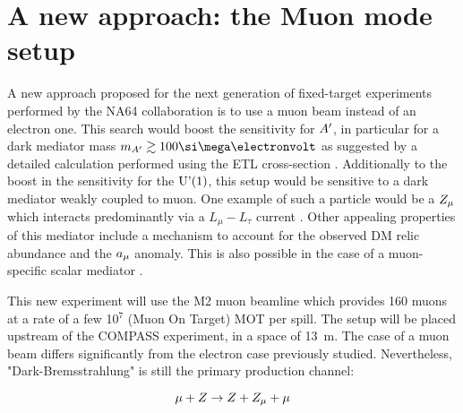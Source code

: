 \FloatBarrier\noindent
\section{A new approach: the Muon mode setup}
\label{ch5:sec:muon-mode-setup}

A new approach proposed for the next generation of fixed-target experiments performed by the NA64 collaboration is to use a muon beam instead of an electron one. This search would boost the sensitivity for $A'$, in particular for a dark mediator mass $m_{\DM} \gtrsim 100 \mev$ as suggested by a detailed calculation performed using the ETL cross-section \cite{Gninenko:2019qiv}. Additionally to the boost in the sensitivity for the $\textrm{U'(1)}$, this setup would be sensitive to a dark mediator weakly coupled to muon. One example of such a particle would be a $Z_{\mu}$ which interacts predominantly via a $L_{\mu} - L_{\tau}$ current \cite{krasnikov2017muon,GNINENKO2001119}. Other appealing properties of this mediator include a mechanism to account for the observed DM relic abundance \cite{GNINENKO2001119,Kirpichnikov:2020tcf,PhysRevLett.121.011102} and the $a_{\mu}$ anomaly. This is also possible in the case of a muon-specific scalar mediator \cite{krasnikov2017light,PhysRevD.95.115005}.

This new experiment will use the M2 muon beamline which provides 160 \gev muons at a rate of a few 10$^7$ (Muon On Target) MOT per spill. The setup will be placed upstream of the COMPASS experiment, in a space of \SI{13}{\meter}. The case of a muon beam differs significantly from the electron case previously studied. Nevertheless, "Dark-Bremsstrahlung" is still the primary production channel:

\begin{equation}
  \label{eq:dm-muon-int}
  \mu + Z \to Z + Z_{\mu} + \mu
\end{equation}

